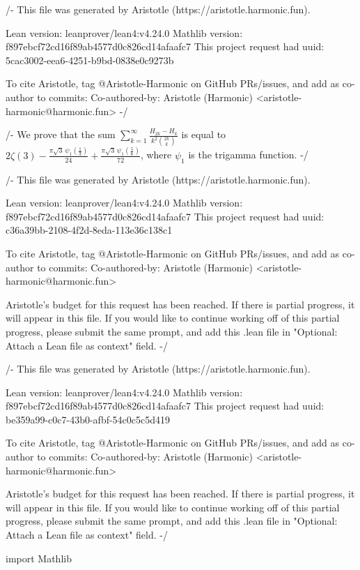 /-
This file was generated by Aristotle (https://aristotle.harmonic.fun).

Lean version: leanprover/lean4:v4.24.0
Mathlib version: f897ebcf72cd16f89ab4577d0c826cd14afaafc7
This project request had uuid: 5cac3002-eea6-4251-b9bd-0838e0c9273b

To cite Aristotle, tag @Aristotle-Harmonic on GitHub PRs/issues, and add as co-author to commits:
Co-authored-by: Aristotle (Harmonic) <aristotle-harmonic@harmonic.fun>
-/

/-
We prove that the sum $\sum_{k=1}^\infty\frac{H_{2k}-H_{k}}{k^2\binom{2k}k}$ is equal to $2 \zeta(3)-\frac{\pi  \sqrt{3}\, \psi_1 \left(\frac{1}{3}\right)}{24}+\frac{\pi  \sqrt{3}\, \psi_1 \left(\frac{5}{6}\right)}{72}$, where $\psi_1$ is the trigamma function.
-/

/-
This file was generated by Aristotle (https://aristotle.harmonic.fun).

Lean version: leanprover/lean4:v4.24.0
Mathlib version: f897ebcf72cd16f89ab4577d0c826cd14afaafc7
This project request had uuid: c36a39bb-2108-4f2d-8eda-113e36c138c1

To cite Aristotle, tag @Aristotle-Harmonic on GitHub PRs/issues, and add as co-author to commits:
Co-authored-by: Aristotle (Harmonic) <aristotle-harmonic@harmonic.fun>

Aristotle's budget for this request has been reached.
If there is partial progress, it will appear in this file.
If you would like to continue working off of this partial progress,
please submit the same prompt, and add this .lean file in "Optional: Attach a Lean file as context" field.
-/

/-
This file was generated by Aristotle (https://aristotle.harmonic.fun).

Lean version: leanprover/lean4:v4.24.0
Mathlib version: f897ebcf72cd16f89ab4577d0c826cd14afaafc7
This project request had uuid: be359a99-c0c7-43b0-afbf-54c0c5c5d419

To cite Aristotle, tag @Aristotle-Harmonic on GitHub PRs/issues, and add as co-author to commits:
Co-authored-by: Aristotle (Harmonic) <aristotle-harmonic@harmonic.fun>

Aristotle's budget for this request has been reached.
If there is partial progress, it will appear in this file.
If you would like to continue working off of this partial progress,
please submit the same prompt, and add this .lean file in "Optional: Attach a Lean file as context" field.
-/

import Mathlib

